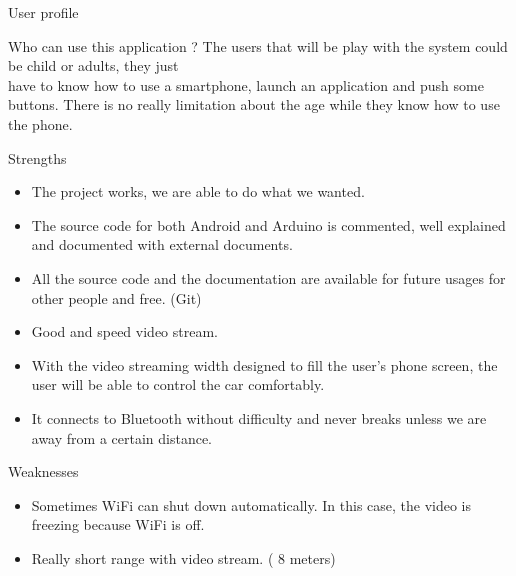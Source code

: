 \documentclass[xcolor=table, 9pt]{beamer}
\begin{document}
\begin{frame}{User profile}
\begin{block}{Who can use this application ?}
The users that will be play with the system could be child or adults, they just\\ \vspace{0.2cm}
have to know how to use a smartphone, launch an application and push some\\ \vspace{0.2cm} buttons. There is no really limitation about the age while they know how to use\\ \vspace{0.2cm} the phone.
\end{block}
\end{frame}


\begin{frame}{Strengths}
\begin{itemize}
\item The project works, we are able to do what we wanted.
\vspace{0.2cm}
\item The source code for both Android and Arduino is commented, well explained and documented with
external documents.
\vspace{0.2cm}
\item All the source code and the documentation are available for future usages for other people and free. (Git)
\vspace{0.2cm}
\item Good and speed video stream.
\vspace{0.2cm}
\item With the video streaming width designed to fill the user’s phone screen, the user will be able to control the car comfortably.
\vspace{0.2cm}
\item It connects to Bluetooth without difficulty and never breaks unless we are away from a certain distance.
\end{itemize}
\end{frame}

\begin{frame}{Weaknesses}
\begin{itemize}
\item Sometimes WiFi can shut down automatically. In this case, the video is freezing because WiFi is off.
\vspace{0.2cm}
\item Really short range with video stream. ( 8 meters)
\end{itemize}

\end{frame}
\end{document}
